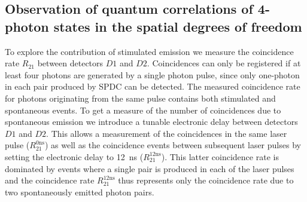 \subsection{Observation of quantum correlations of 4-photon states in the spatial degrees of freedom}

To explore the contribution of stimulated emission we measure the coincidence rate $R_{21}$ between detectors $D1$ and $D2$. Coincidences can only be registered if at least four photons are generated by a single photon pulse, since only one-photon in each pair produced by SPDC can be detected. The measured coincidence rate for photons originating from the same pulse contains both stimulated and spontaneous events. To get a measure of the number of coincidences due to spontaneous emission we introduce a tunable electronic delay between detectors $D1$ and $D2$. This allows a measurement of the coincidences in the same laser pulse ($R_{21}^{0\mathrm{ns}}$) as well as the coincidence events between subsequent laser pulses by setting the electronic delay to 12~ns ($R_{21}^{12\mathrm{ns}}$). This latter coincidence rate is dominated by events where a single pair is produced in each of the laser pulses and the coincidence rate $R_{21}^{12\mathrm{ns}}$ thus represents only the coincidence rate due to two spontaneously emitted photon pairs.

